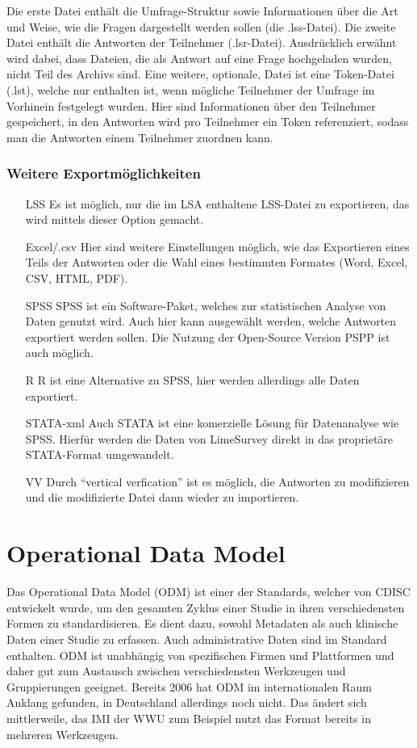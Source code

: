 Die erste Datei enthält die Umfrage-Struktur sowie Informationen über die Art und Weise, wie die Fragen dargestellt werden sollen (die .lss-Datei).
Die zweite Datei enthält die Antworten der Teilnehmer (.lsr-Datei).
Ausdrücklich erwähnt wird dabei, dass Dateien, die als Antwort auf eine Frage hochgeladen wurden, nicht Teil des Archivs sind.
Eine weitere, optionale, Datei ist eine Token-Datei (.lst), welche nur enthalten ist, wenn mögliche Teilnehmer der Umfrage im Vorhinein festgelegt wurden.
Hier sind Informationen über den Teilnehmer gespeichert, in den Antworten wird pro Teilnehmer ein Token referenziert, sodass man die Antworten einem Teilnehmer zuordnen kann.

\subsubsection{Weitere Exportmöglichkeiten}
\begin{itemize}
	\item[LSS] Es ist möglich, nur die im LSA enthaltene LSS-Datei zu exportieren, das wird mittels dieser Option gemacht.
	\item[Excel/.csv] Hier sind weitere Einstellungen möglich, wie das Exportieren eines Teils der Antworten oder die Wahl eines bestimmten Formates (Word, Excel, CSV, HTML, PDF).
	\item[SPSS] SPSS ist ein Software-Paket, welches zur statistischen Analyse von Daten genutzt wird. Auch hier kann ausgewählt werden, welche Antworten exportiert werden sollen. Die Nutzung der Open-Source Version PSPP ist auch möglich.
	\item[R] R ist eine Alternative zu SPSS, hier werden allerdings alle Daten exportiert.
	\item[STATA-xml] Auch STATA ist eine komerzielle Lösung für Datenanalyse wie SPSS. Hierfür werden die Daten von LimeSurvey direkt in das proprietäre STATA-Format umgewandelt.
	\item[VV] Durch \enquote{vertical verfication} ist es möglich, die Antworten zu modifizieren und die modifizierte Datei dann wieder zu importieren.
\end{itemize}

\section{Operational Data Model}
\label{m:odm}

Das Operational Data Model (ODM) ist einer der Standards, welcher von CDISC entwickelt wurde, um den gesamten Zyklus einer Studie in ihren verschiedensten Formen zu standardisieren.
Es dient dazu, sowohl Metadaten als auch klinische Daten einer Studie zu erfassen. Auch administrative Daten sind im Standard enthalten.
ODM ist unabhängig von spezifischen Firmen und Plattformen und daher gut zum Austausch zwischen verschiedensten Werkzeugen und Gruppierungen geeignet.
Bereits 2006 hat ODM im internationalen Raum Anklang gefunden, in Deutschland allerdings noch nicht\cite{odm_art}.
Das ändert sich mittlerweile, das IMI der WWU zum Beispiel nutzt das Format bereits in mehreren Werkzeugen.

